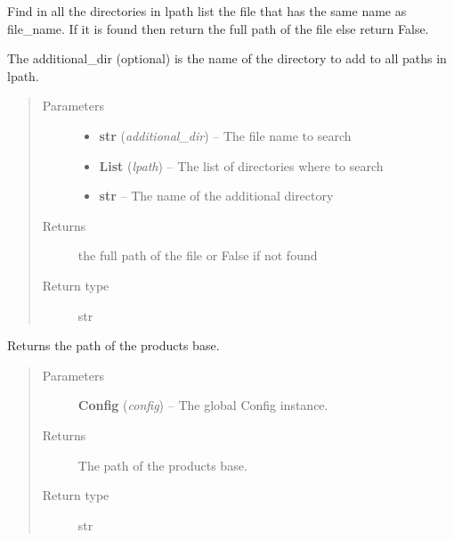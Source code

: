 \documentclass[a4paper,10pt,english]{sphinxmanual}
\begin{document}
\begin{fulllineitems}
\label{commands/apidoc/src:src.__init__.find_file_in_lpath}
Find in all the directories in lpath list the file that has the same name
as file\_name. 
If it is found 
then return the full path of the file
else return False.

The additional\_dir (optional) is the name of the directory to add to all 
paths in lpath.
\begin{quote}\begin{description}
\item[{Parameters}] \leavevmode\begin{itemize}
\item {} 
\textbf{str} (\emph{additional\_dir}) -- The file name to search

\item {} 
\textbf{List} (\emph{lpath}) -- The list of directories where to search

\item {} 
\textbf{str} -- The name of the additional directory

\end{itemize}

\item[{Returns}] \leavevmode
the full path of the file or False if not found

\item[{Return type}] \leavevmode
str

\end{description}\end{quote}

\end{fulllineitems}


\begin{fulllineitems}
\label{commands/apidoc/src:src.__init__.get_base_path}
Returns the path of the products base.
\begin{quote}\begin{description}
\item[{Parameters}] \leavevmode
\textbf{Config} (\emph{config}) -- The global Config instance.

\item[{Returns}] \leavevmode
The path of the products base.

\item[{Return type}] \leavevmode
str

\end{description}\end{quote}

\end{fulllineitems}
\end{document}
